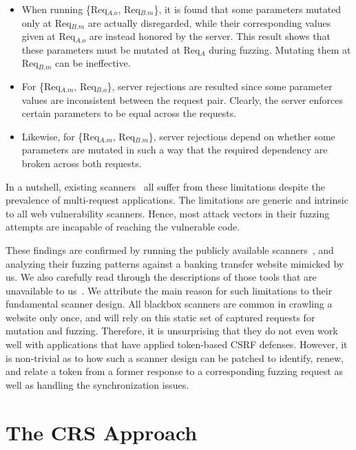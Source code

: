 \documentclass[letter]{sig-alternate-2013}
\begin{document}
\begin{itemize}

\item When running \{Req$_{A.o}$, Req$_{B.m}$\}, it is found that some parameters mutated only at Req$_{B.m}$ are actually disregarded, while their corresponding values given at Req$_{A.o}$ are instead honored by the server. This result shows that these parameters must be mutated at Req$_A$ during fuzzing. Mutating them at Req$_{B.m}$ can be ineffective.
\item For \{Req$_{A.m}$, Req$_{B.o}$\}, server rejections are resulted since some parameter values are inconsistent between the request pair. Clearly, the server enforces certain parameters to be equal across the requests. 
\item Likewise, for \{Req$_{A.m}$, Req$_{B.m}$\}, server rejections depend on whether some parameters are mutated in such a way that the required dependency are broken across both requests.
\end{itemize}

In a nutshell, existing scanners~\cite{notamper,acunetix,webscarab,tamperdata,acunetixwvs,skipfish,state-aware} all suffer from these limitations despite the prevalence of multi-request applications. The limitations are generic and intrinsic to all web vulnerability scanners. Hence, most attack vectors in their fuzzing attempts are incapable of reaching the vulnerable code. 

These findings are confirmed by running the publicly available scanners~\cite{acunetix,tamperdata,webscarab,acunetixwvs,skipfish}, and analyzing their fuzzing patterns against a banking transfer website mimicked by us. We also carefully read through the descriptions of those tools that are unavailable to us~\cite{state-aware,notamper}. We attribute the main reason for such limitations to their fundamental scanner design. All blackbox scanners are common in crawling a website only once, and will rely on this static set of captured requests for mutation and fuzzing. Therefore, it is unsurprising that they do not even work well with applications that have applied token-based CSRF defenses. However, it is non-trivial as to how such a scanner design can be patched to identify, renew, and relate a token from a former response to a corresponding fuzzing request as well as handling the synchronization issues.

 \section{The CRS Approach}
\label{sec:crs_approach}
\end{document}
